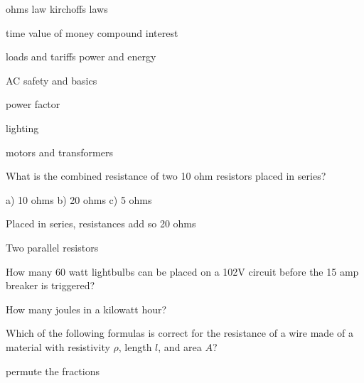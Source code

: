 \documentclass[12pt, oneside]{article}
\begin{document}

ohms law kirchoffs laws


time value of money
compound interest


loads and tariffs
power and energy


AC
safety and basics


power factor


lighting


motors and transformers






What is the combined resistance of two 10 ohm resistors placed in
series?

a) 10 ohms
b) 20 ohms
c) 5 ohms


Placed in series, resistances add so 20 ohms


Two parallel resistors



How many 60 watt lightbulbs can be placed on a 102V circuit before the 15 amp
breaker is triggered?


How many joules in a kilowatt hour?


Which of the following formulas is correct for the resistance of a wire
made of a material with resistivity $\rho$, length $l$, and area $A$?

permute the fractions












\end{document}
